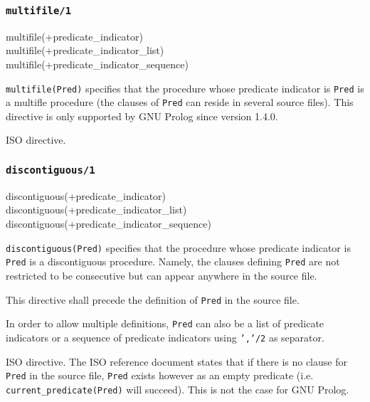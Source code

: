 \subsubsection{\texttt{multifile/1}}

\begin{TemplatesOneCol}
multifile(+predicate\_indicator)\\
multifile(+predicate\_indicator\_list)\\
multifile(+predicate\_indicator\_sequence)

\end{TemplatesOneCol}

\Description

\texttt{multifile(Pred)} specifies that the procedure whose predicate
indicator is \texttt{Pred} is a multifle procedure (the clauses of
\texttt{Pred} can reside in several source files). This directive is only
supported by GNU Prolog since version 1.4.0.

\Portability

ISO directive.

\subsubsection{\texttt{discontiguous/1}}

\begin{TemplatesOneCol}
discontiguous(+predicate\_indicator)\\
discontiguous(+predicate\_indicator\_list)\\
discontiguous(+predicate\_indicator\_sequence)

\end{TemplatesOneCol}

\Description

\texttt{discontiguous(Pred)} specifies that the procedure whose predicate
indicator is \texttt{Pred} is a discontiguous procedure. Namely, the clauses
defining \texttt{Pred} are not restricted to be consecutive but can appear
anywhere in the source file.

This directive shall precede the definition of \texttt{Pred} in the source
file.

In order to allow multiple definitions, \texttt{Pred} can also be a list of
predicate indicators or a sequence of predicate indicators using
\texttt{','/2} as separator.

\Portability

ISO directive. The ISO reference document states that if there is no clause
for \texttt{Pred} in the source file, \texttt{Pred} exists however as an
empty predicate (i.e. \texttt{current\_predicate(Pred)} will succeed). This
is not the case for GNU Prolog.

